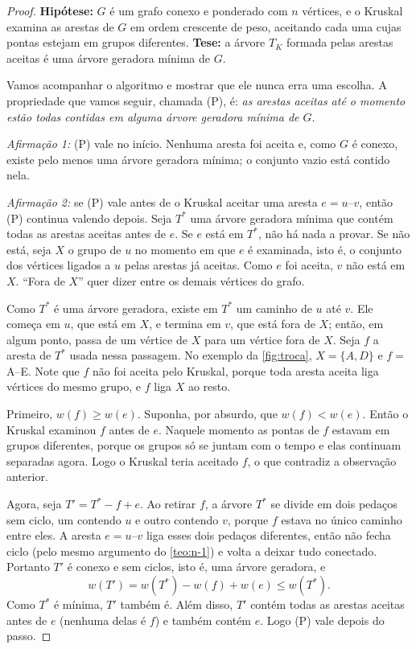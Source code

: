 \documentclass[a4paper]{article}
\begin{document}
\begin{proof}
\textbf{Hipótese:} $G$ é um grafo conexo e ponderado com $n$ vértices, e o
Kruskal examina as arestas de $G$ em ordem crescente de peso, aceitando cada uma
cujas pontas estejam em grupos diferentes. \textbf{Tese:} a árvore $T_K$ formada
pelas arestas aceitas é uma árvore geradora mínima de $G$.

Vamos acompanhar o algoritmo e mostrar que ele nunca erra uma escolha. A
propriedade que vamos seguir, chamada (P), é: \emph{as arestas aceitas até o
momento estão todas contidas em alguma árvore geradora mínima de $G$}.

\emph{Afirmação 1:} (P) vale no início. Nenhuma aresta foi aceita e, como $G$ é
conexo, existe pelo menos uma árvore geradora mínima; o conjunto vazio está
contido nela.

\emph{Afirmação 2:} se (P) vale antes de o Kruskal aceitar uma aresta $e = u$--$v$,
então (P) continua valendo depois. Seja $T^*$ uma árvore geradora mínima que
contém todas as arestas aceitas antes de $e$. Se $e$ está em $T^*$, não há nada a
provar. Se não está, seja $X$ o grupo de $u$ no momento em que $e$ é examinada,
isto é, o conjunto dos vértices ligados a $u$ pelas arestas já aceitas. Como $e$
foi aceita, $v$ não está em $X$. ``Fora de $X$'' quer dizer entre os demais
vértices do grafo.

Como $T^*$ é uma árvore geradora, existe em $T^*$ um caminho de $u$ até $v$. Ele
começa em $u$, que está em $X$, e termina em $v$, que está fora de $X$; então, em
algum ponto, passa de um vértice de $X$ para um vértice fora de $X$. Seja $f$ a
aresta de $T^*$ usada nessa passagem. No exemplo da \cref{fig:troca},
$X = \{A, D\}$ e $f = $ A--E. Note que $f$ não foi aceita pelo Kruskal, porque
toda aresta aceita liga vértices do mesmo grupo, e $f$ liga $X$ ao resto.

Primeiro, $w(f) \ge w(e)$. Suponha, por absurdo, que $w(f) < w(e)$. Então o
Kruskal examinou $f$ antes de $e$. Naquele momento as pontas de $f$ estavam em
grupos diferentes, porque os grupos só se juntam com o tempo e elas continuam
separadas agora. Logo o Kruskal teria aceitado $f$, o que contradiz a observação
anterior.

Agora, seja $T' = T^* - f + e$. Ao retirar $f$, a árvore $T^*$ se divide em dois
pedaços sem ciclo, um contendo $u$ e outro contendo $v$, porque $f$ estava no
único caminho entre eles. A aresta $e = u$--$v$ liga esses dois pedaços
diferentes, então não fecha ciclo (pelo mesmo argumento do \cref{teo:n-1}) e
volta a deixar tudo conectado. Portanto $T'$ é conexo e sem ciclos, isto é, uma
árvore geradora, e
\[
    w(T') = w(T^*) - w(f) + w(e) \le w(T^*).
\]
Como $T^*$ é mínima, $T'$ também é. Além disso, $T'$ contém todas as arestas
aceitas antes de $e$ (nenhuma delas é $f$) e também contém $e$. Logo (P) vale
depois do passo.


\end{proof}
\end{document}
